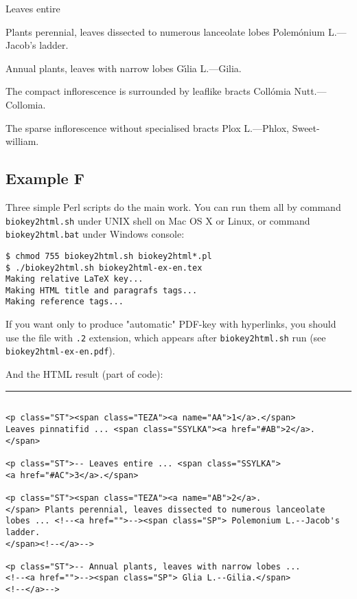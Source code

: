 \documentclass[a4paper,12pt]{article}
\begin{document}
\AN Leaves entire 

 Plants perennial, leaves dissected to numerous lanceolate 
lobes \T Polem\'onium L.---Jacob's ladder.

\AN Annual plants, leaves with narrow lobes \T G\'\i{}lia L.---Gilia.

 The compact inflorescence is surrounded by leaflike 
bracts \T Coll\'omia Nutt.---Collomia.

\AN The sparse inflorescence without specialised bracts \T
Plox L.---Phlox, Sweet-william.

\subsection*{Example F}

Three simple \textsf{Perl} scripts do the main work. You can run them all by command \texttt{biokey2html.sh} under UNIX shell on \textsf{Mac OS X} or \textsf{Linux}, or command \texttt{biokey2html.bat} under \textsf{Windows} console:

\begin{verbatim}
$ chmod 755 biokey2html.sh biokey2html*.pl
$ ./biokey2html.sh biokey2html-ex-en.tex 
Making relative LaTeX key... 
Making HTML title and paragrafs tags... 
Making reference tags... 
\end{verbatim}

If you want only to produce "automatic" PDF-key with hyperlinks, you should use the file with \texttt{.2} extension, which appears after \texttt{biokey2html.sh} run (see \texttt{biokey2html-ex-en.pdf}).

And the HTML result (part of code):

\bigskip\hrule
\begin{verbatim}

<p class="ST"><span class="TEZA"><a name="AA">1</a>.</span> 
Leaves pinnatifid ... <span class="SSYLKA"><a href="#AB">2</a>.
</span>

<p class="ST">-- Leaves entire ... <span class="SSYLKA">
<a href="#AC">3</a>.</span>

<p class="ST"><span class="TEZA"><a name="AB">2</a>.
</span> Plants perennial, leaves dissected to numerous lanceolate 
lobes ... <!--<a href="">--><span class="SP"> Polemonium L.--Jacob's ladder.
</span><!--</a>-->

<p class="ST">-- Annual plants, leaves with narrow lobes ...
<!--<a href="">--><span class="SP"> Glia L.--Gilia.</span>
<!--</a>-->

\end{verbatim}
\end{document}
